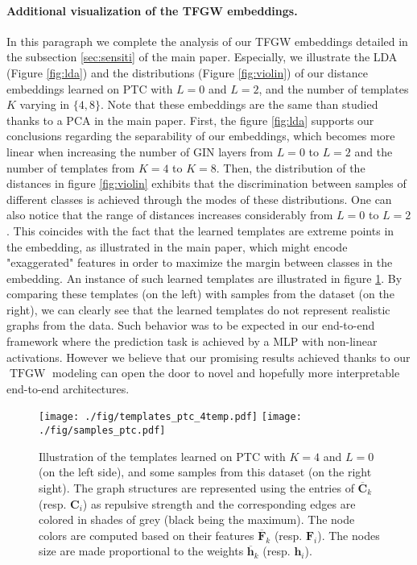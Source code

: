 \documentclass{article}
\def\vh{{\bm{h}}}
\def\mC{{\bm{C}}}
\def\mF{{\bm{F}}}
\newcommand{\TFGW}{\operatorname{TFGW}}
\begin{document}
{\paragraph{Additional visualization of the TFGW embeddings.} In this paragraph we complete the analysis of our TFGW embeddings detailed in the subsection \ref{sec:sensiti} of the main paper. Especially, we illustrate the LDA (Figure \ref{fig:lda}) and the distributions (Figure \ref{fig:violin}) of our distance embeddings learned on PTC with $L=0$ and $L=2$, and the number of templates $K$ varying in $\{4, 8\}$. Note that these embeddings are the same than studied thanks to a PCA in the main paper. First, the figure \ref{fig:lda} supports our conclusions regarding the separability of our embeddings, which becomes more linear when increasing the number of GIN layers from $L=0$ to $L=2$ and the number of templates from $K=4$ to $K=8$. Then, the distribution of the distances in figure \ref{fig:violin} exhibits that the discrimination between samples of different classes is achieved through the modes of these distributions. One can also notice that the range of distances increases considerably from $L=0$ to $L=2$. This coincides with the fact that the learned templates are extreme points in the embedding, as illustrated in the main paper, which might encode "exaggerated" features in order to maximize the margin between classes in the embedding. An instance of such learned templates are illustrated in figure \ref{fig:templates}. By comparing these templates (on the left) with samples from the dataset (on the right), we can clearly see that the learned templates do not represent realistic graphs from the data. Such behavior was to be expected in our end-to-end framework where the prediction task is achieved by a MLP with non-linear activations. However we believe that our promising results achieved thanks to our $\TFGW$ modeling can open the door to novel and
hopefully more interpretable end-to-end architectures.
\begin{figure}[!t]
	\begin{center}
			\texttt{[image: ./fig/templates\_ptc\_4temp.pdf]} \hfill \texttt{[image: ./fig/samples\_ptc.pdf]}
	\end{center}
\caption{\label{fig:templates} Illustration of the templates learned on PTC with $K=4$ and $L=0$ (on the left side), and some samples from this dataset (on the right sight). The graph structures are represented using the entries of $\overline{\mC}_k$ (resp. $\mC_i$) as repulsive strength and the corresponding edges are colored in shades of grey (black being the maximum). The node colors are computed based on their features $\overline{\mF}_k$ (resp. $\mF_i$). The nodes size are made proportional to the weights $\overline{\vh}_k$ (resp. $\vh_i$).}
\end{figure}

}
\end{document}
